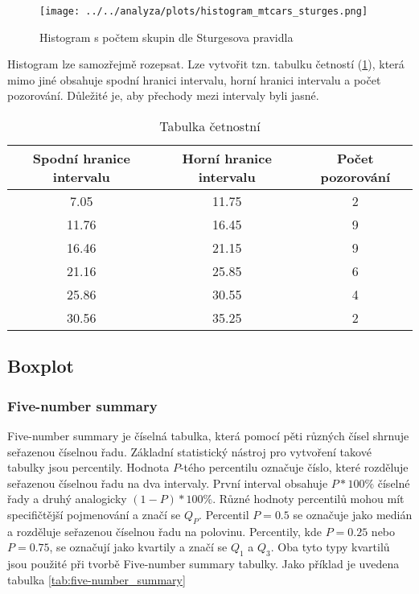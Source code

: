 \begin{figure}[H]
    \centering
    \texttt{[image: ../../analyza/plots/histogram\_mtcars\_sturges.png]}
    \caption{Histogram s počtem skupin dle Sturgesova pravidla} 
    \label{fig:histogram_mtcars_sturges}
\end{figure}

Histogram lze samozřejmě rozepsat. Lze vytvořit tzn. tabulku četností (\ref{tab:tabulka_cetnosti_sturges}),
která mimo jiné obsahuje spodní hranici intervalu, horní hranici intervalu a počet pozorování. Důležité je,
aby přechody mezi intervaly byli jasné.

\begin{table}[H]

        \centering
    \begin{tabular}[t]{c|c|c}
        \hline
        Spodní hranice intervalu & Horní hranice intervalu & Počet pozorování\\
        \hline
        7.05 & 11.75 & 2\\
        \hline
        11.76 & 16.45 & 9\\
        \hline
        16.46 & 21.15 & 9\\
        \hline
        21.16 & 25.85 & 6\\
        \hline
        25.86 & 30.55 & 4\\
        \hline
        30.56 & 35.25 & 2\\
        \hline
    \end{tabular}
    \caption{\label{tab:tabulka_cetnosti_sturges}Tabulka četnostní}
\end{table}

\subsection{Boxplot}
\subsubsection{Five-number summary}
Five-number summary je číselná tabulka, která pomocí pěti různých čísel shrnuje seřazenou číselnou řadu. Základní statistický nástroj pro
vytvoření takové tabulky jsou percentily. Hodnota $P$-tého percentilu označuje číslo, které rozděluje seřazenou číselnou řadu na dva intervaly. 
První interval obsahuje $P*100\%$ číselné řady a druhý analogicky $(1-P)*100\%$. Různé hodnoty percentilů mohou mít specifičtější pojmenování a značí se $Q_P$.
Percentil $P = 0.5$ se označuje jako medián a rozděluje seřazenou číselnou řadu na polovinu. Percentily, kde $P = 0.25$ nebo $P = 0.75$, se označují
jako kvartily a značí se $Q_{1}$ a $Q_{3}$. Oba tyto typy kvartilů jsou použité při tvorbě Five-number summary tabulky. Jako příklad je
uvedena tabulka \ref{tab:five-number_summary}

